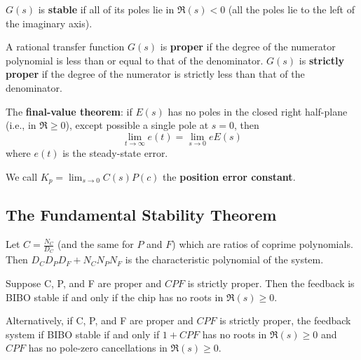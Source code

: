 \documentclass[12pt]{article}
\begin{document}
$G(s)$ is {\bf stable} if all of its poles lie in $\Re(s) < 0$ (all the poles lie to the left of the imaginary axis).

A rational transfer function $G(s)$ is {\bf proper} if the degree of the numerator polynomial is less than or equal to that of the denominator. $G(s)$ is {\bf strictly proper} if the degree of the numerator is strictly less than that of the denominator.

The {\bf final-value theorem}: if $E(s)$ has no poles in the closed right half-plane (i.e., in $\Re \geq 0$), except possible a single pole at $s = 0$, then \[ \lim_{t\to\infty} e(t) = \lim_{s\to 0} eE(s) \] where $e(t)$ is the steady-state error.

We call $K_p = \lim_{s\to 0} C(s) P(c)$ the {\bf position error constant}.

\subsection{The Fundamental Stability Theorem}
Let $C = \frac{N_C}{D_C}$ (and the same for $P$ and $F$) which are ratios of coprime polynomials. Then $D_CD_PD_F + N_CN_PN_F$ is the characteristic polynomial of the system.

Suppose C, P, and F are proper and $CPF$ is strictly proper. Then the feedback is BIBO stable if and only if the chip has no roots in $\Re(s) \geq 0$.

Alternatively, if C, P, and F are proper and $CPF$ is strictly proper, the feedback system if BIBO stable if and only if $1 + CPF$ has no roots in $\Re(s) \geq 0$ and $CPF$ has no pole-zero cancellations in $\Re(s) \geq 0$.
\end{document}
